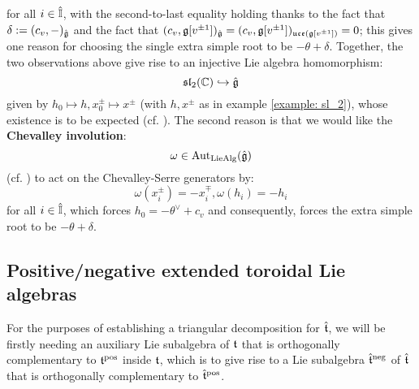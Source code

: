         for all $i \in \hat{\mathbb{I}}$, with the second-to-last equality holding thanks to the fact that $\delta := (c_v, -)_{\hat{\mathfrak{g}}}$ and the fact that $(c_v, \mathfrak{g}[v^{\pm 1}])_{\hat{\mathfrak{g}}} = (c_v, \mathfrak{g}[v^{\pm 1}])_{\mathfrak{uce}(\mathfrak{g}[v^{\pm 1}])} = 0$; this gives one reason for choosing the single extra simple root to be $-\theta + \delta$. Together, the two observations above give rise to an injective Lie algebra homomorphism:
            $$\mathfrak{sl}_2(\mathbb{C}) \hookrightarrow \hat{\mathfrak{g}}$$
        given by $h_0 \mapsto h, x_0^{\pm} \mapsto x^{\pm}$ (with $h, x^{\pm}$ as in example \ref{example: sl_2}), whose existence is to be expected (cf. \cite[Section 3.3]{kac_infinite_dimensional_lie_algebras}). The second reason is that we would like the \textbf{Chevalley involution}:
            $$\omega \in \mathrm{Aut}_{\mathrm{Lie}\mathrm{Alg}}(\hat{\mathfrak{g}})$$
        (cf. \cite[p. 7]{kac_infinite_dimensional_lie_algebras}) to act on the Chevalley-Serre generators by:
            $$\omega(x_i^{\pm}) = -x_i^{\mp}, \omega(h_i) = -h_i$$
        for all $i \in \hat{\mathbb{I}}$, which forces $h_0 = -\theta^{\vee} + c_v$ and consequently, forces the extra simple root to be $-\theta + \delta$.
        

    \subsection{Positive/negative extended toroidal Lie algebras}
        For the purposes of establishing a triangular decomposition for $\hat{\mathfrak{t}}$, we will be firstly needing an auxiliary Lie subalgebra of $\mathfrak{t}$ that is orthogonally complementary to $\mathfrak{t}^{\mathrm{pos}}$ inside $\mathfrak{t}$, which is to give rise to a Lie subalgebra $\hat{\mathfrak{t}}^{\mathrm{neg}}$ of $\hat{\mathfrak{t}}$ that is orthogonally complementary to $\hat{\mathfrak{t}}^{\mathrm{pos}}$.

